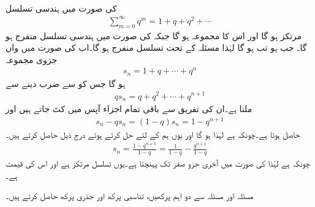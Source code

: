 \quad {}\\
 کی صورت میں ہندسی تسلسل
\begin{align*}
\sum_{m=0}^{\infty} q^m=1+q+q^2+\cdots
\end{align*}
مرتکز ہو گا اور اس کا مجموعہ  ہو گا جبکہ  کی صورت میں ہندسی تسلسل منفرج ہو گا۔ 
\quad
جب  ہو تب  ہو گا لہٰذا مسئلہ  کے تحت تسلسل منفرج ہو گا۔اب   کی صورت میں  واں جزوی مجموعہ
\begin{align*}
s_n=1+q+\cdots+q^n
\end{align*}
ہو گا جس کو  سے ضرب دینے سے
\begin{align*}
qs_n=q+q^2+\cdots+q^{n+1}
\end{align*}
ملتا ہے۔ان کی تفریق سے  باقی تمام اجزاء  آپس میں کٹ جاتے ہیں اور
\begin{align*}
s_n-qs_n=(1-q)s_n=1-q^{n+1}
\end{align*}
حاصل ہوتا ہے۔چونکہ  ہے لہٰذا  ہو گا اور یوں ہم  کے لئے حل کرتے ہوئے درج ذیل حاصل کرتے ہیں۔
\begin{align}
s_n=\frac{1-q^{n+1}}{1-q}=\frac{1}{1-q}-\frac{q^{n+1}}{1-q}
\end{align}
چونکہ  ہے لہٰذا  کی صورت میں  آخری جزو صفر تک پہنچتا ہے۔یوں تسلسل مرتکز ہے اور اس کی قیمت  ہے۔ 

مسئلہ  اور مسئلہ  سے دو اہم پرکھیں، تناسبی پرکھ اور جذری پرکھ حاصل کرتے ہیں۔

